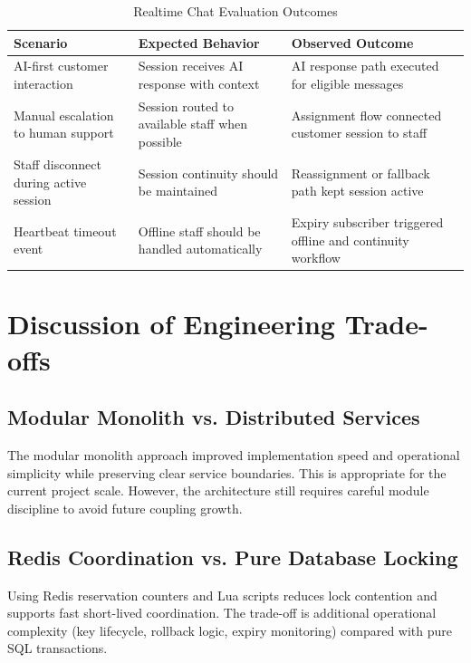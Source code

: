 \begin{table}[H]
\centering
\caption{Realtime Chat Evaluation Outcomes}
\label{tab:discussion-chat-outcomes}
\begin{tabular}{|p{3.4cm}|p{4.2cm}|p{4.4cm}|}
\hline
\textbf{Scenario} & \textbf{Expected Behavior} & \textbf{Observed Outcome} \\
\hline
AI-first customer interaction & Session receives AI response with context & AI response path executed for eligible messages \\
\hline
Manual escalation to human support & Session routed to available staff when possible & Assignment flow connected customer session to staff \\
\hline
Staff disconnect during active session & Session continuity should be maintained & Reassignment or fallback path kept session active \\
\hline
Heartbeat timeout event & Offline staff should be handled automatically & Expiry subscriber triggered offline and continuity workflow \\
\hline
\end{tabular}
\end{table}

\section{Discussion of Engineering Trade-offs}

\subsection{Modular Monolith vs. Distributed Services}

The modular monolith approach improved implementation speed and operational simplicity while preserving clear service boundaries. This is appropriate for the current project scale. However, the architecture still requires careful module discipline to avoid future coupling growth.

\subsection{Redis Coordination vs. Pure Database Locking}

Using Redis reservation counters and Lua scripts reduces lock contention and supports fast short-lived coordination. The trade-off is additional operational complexity (key lifecycle, rollback logic, expiry monitoring) compared with pure SQL transactions.

